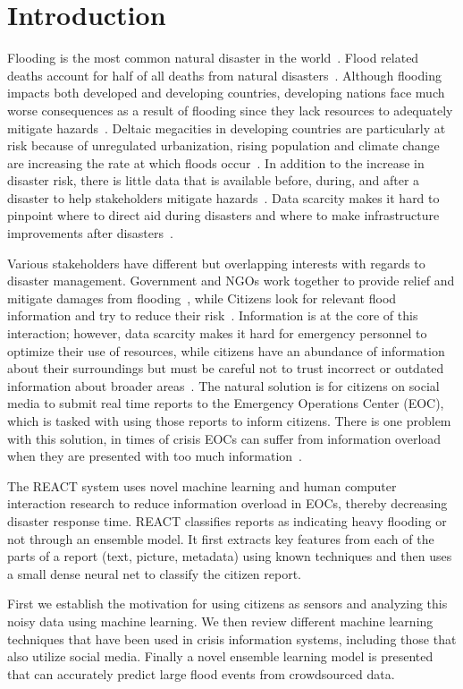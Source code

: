 \chapter{Introduction} Flooding is the most common natural disaster in the
world~\cite{chanFloodRiskAsia2012}.  Flood related deaths account for half of
all deaths from natural disasters~\cite{ohlFloodingHumanHealth2000}. Although
flooding impacts both developed and developing countries, developing nations
face much worse consequences as a result of flooding since they lack resources
to adequately mitigate
hazards~\cite{quarantelliUrbanVulnerabilityDisasters2003}. Deltaic megacities
in developing countries are particularly at risk because of unregulated
urbanization, rising population and climate change are increasing the rate at
which floods occur~\cite{chanFloodRiskAsia2012}. In
addition to the increase in disaster risk, there is little data that is
available before, during, and after a disaster to help stakeholders mitigate
hazards~\cite{meierDigitalHumanitariansHow2015}. Data scarcity makes it hard to
pinpoint where to direct aid during disasters and where to make infrastructure
improvements after disasters~\cite{ranaMultidimensionalModelVulnerability2018}.

Various stakeholders have different but overlapping interests with regards to
disaster management. Government and NGOs work together to provide relief and
mitigate damages from flooding~\cite{chanResilientFloodRisk2018}, while Citizens
look for relevant flood information and try to reduce their
risk~\cite{viewegMicrobloggingTwoNatural2010}. Information is at the core of
this interaction; however, data scarcity makes it hard for emergency personnel
to optimize their use of resources, while citizens have an abundance of
information about their surroundings but must be careful not to trust incorrect
or outdated information about broader
areas~\cite{quarantelliProblematicalAspectsInformation1997}. The natural
solution is for citizens on social media to submit real time reports to the
Emergency Operations Center (EOC), which is tasked with using those reports to
inform citizens.  There is one problem with this solution, in times of crisis
EOCs can suffer from information overload when they are presented with too much
information~\cite{tierneyFacingUnexpectedDisaster2001}.

The REACT system uses novel machine learning and human computer interaction
research to reduce information overload in EOCs, thereby decreasing disaster
response time. REACT classifies reports as indicating heavy flooding or not
through an ensemble model. It first extracts key features from each of the parts
of a report (text, picture, metadata) using known techniques and then uses a
small dense neural net to classify the citizen report.

    First we establish the motivation for using citizens as sensors and
analyzing this noisy data using machine learning. We then review different
machine learning techniques that have been used in crisis information systems,
including those that also utilize social media.  Finally a novel ensemble
learning model is presented that can accurately predict large flood events from
crowdsourced data.
